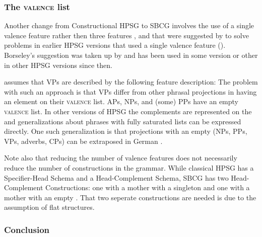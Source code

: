 \subsubsection{The \textsc{valence} list}
\label{sec-valence-feature-sbcg}

Another change from Constructional HPSG to SBCG involves the use of a single valence feature rather
then three features \spr, \subj and \comps that were suggested by \citet{Borsley87} to solve problems in
earlier HPSG versions that used a single valence feature (\subcat). Borseley's suggestion was taken up by
\citet[Chapter~9]{ps2} and has been used in some version or other in other HPSG versions since then. 

\citet[]{Sag2012a} assumes that VPs are described by the following
feature description:
\ea
{}
\z
The problem with such an approach is that VPs differ from other phrasal projections in having an
element on their \textsc{valence} list. APs, NPs, and (some) PPs have an empty \textsc{valence} list. In
other versions of HPSG the complements are represented on the \compsl and generalizations about
phrases with fully saturated \comps lists can be expressed directly. One such generalization is that
projections with an empty \compsl (NPs, PPs, VPs, adverbs, CPs) can be extraposed in German \citep[Section~13.1.2]{Mueller99a}.

Note also that reducing the number of valence features does not necessarily reduce the number of
constructions in the grammar. While classical HPSG has a Specifier-Head Schema and a Head-Complement
Schema, SBCG has two Head-Complement Constructions: one with a mother with a singleton \compsl and
one with a mother with an empty \compsl \citep[]{Sag2012a}. That two seperate constructions
are needed is due to the assumption of flat structures.


\subsubsection{Conclusion}

